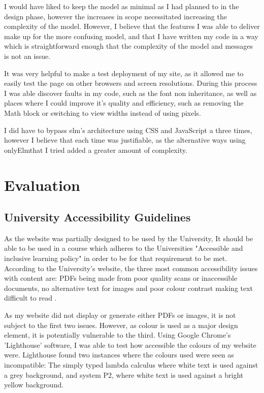 \documentclass{l4proj}
\begin{document}
I would have liked to keep the model as minimal as I had planned to in the design phase, however the increases in scope necessitated increasing the complexity of the model.  However, I believe that the features I was able to deliver make up for the more confusing model, and that I have written my code in a way which is straightforward enough that the complexity of the model and messages is not an issue.

It was very helpful to make a test deployment of my site, as it allowed me to easily test the page on other browsers and screen resolutions.  During this process I was able discover faults in my code, such as the font non inheritance, as well as places where I could improve it's quality and efficiency, such as removing the Math block or switching to view widths instead of using pixels.

I did have to bypass elm's architecture using CSS and JavaScript a three times, however I believe that each time was justifiable, as the alternative ways using onlyElmthat I tried added a greater amount of complexity.
\chapter{Evaluation} 

\section{University Accessibility Guidelines}

As the website was partially designed to be used by the University, It should be able to be used in a course which adheres to the Universities "Accessible and inclusive learning policy" in order to be for that requirement to be met. According to the University's website, the three most common accessibility issues with content are: PDFs being made from poor quality scans or inaccessible documents, no alternative text for images and poor colour contrast making text difficult to read \cite{accessible_inclusive}.

As my website did not display or generate either PDFs or images, it is not subject to the first two issues.  However, as colour is used as a major design element, it is potentially vulnerable to the third.  Using Google Chrome's 'Lighthouse' software, I was able to test how accessible the colours of my website were.  Lighthouse found two instances where the colours used were seen as incompatible: The simply typed lambda calculus where white text is used against a grey background, and system P2, where white text is used against a bright yellow background.
\end{document}

